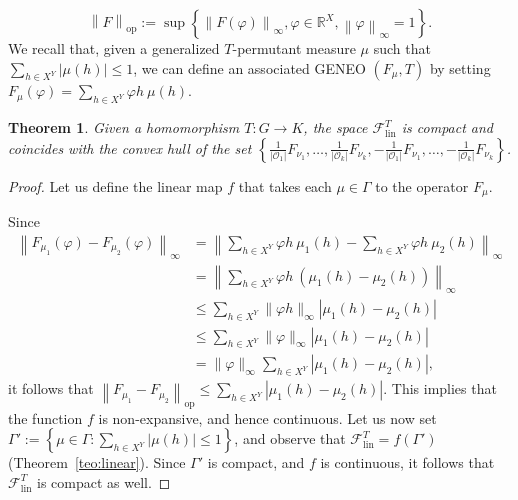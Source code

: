 \documentclass[11pt]{article}
\newcommand{\R}{\mathbb{R}}
\newcommand{\p}{\varphi}
\newtheorem{theorem}{Theorem}[section]
\begin{document}
{\[
\left\| F \right\|_\mathrm{op} := \sup\left\{ \left\| F(\p) \right\|_\infty, \p \in \R^X, \left\| \p \right\|_\infty = 1 \right\}.
\]
We recall that, given a generalized $T$-permutant measure $\mu$ such that $\sum_{h\in X^Y}|\mu(h)|\le 1$, 
we can define an associated GENEO $(F_\mu,T)$ by setting 
$F_\mu(\p)=\sum_{h \in X^Y} \varphi h \ \mu(h)$.
\begin{theorem}\label{thmcomp&conv}
    Given a homomorphism $T \colon G \to K$, the space $\mathcal{F}_\mathrm{lin}^T$ is compact and coincides with the convex hull of the set $\left\{\frac{1}{|\mathcal{O}_1|}F_{\nu_1},\ldots, 
    \frac{1}{|\mathcal{O}_k|}F_{\nu_k},
    -\frac{1}{|\mathcal{O}_1|}F_{\nu_1},\ldots, 
    -\frac{1}{|\mathcal{O}_k|}F_{\nu_k}\right\}$.
\end{theorem}
\begin{proof}
Let us define the linear map $f$
that takes each $\mu\in\Gamma$ to the operator $F_\mu$.

Since
$$\begin{aligned}
\left\|F_{\mu_1}(\varphi)-F_{\mu_2}(\varphi)\right\|_\infty
&=\left\|\sum_{h\in X^Y} \varphi h\ \mu_1(h)-\sum_{h\in X^Y} \varphi h\ \mu_2(h)\right\|_\infty \\
&=\left\|\sum_{h\in X^Y} \varphi h \ (\mu_1(h)-\mu_2(h))\right\|_\infty \\
&\le \sum_{h\in X^Y} \|\varphi h\|_\infty|\mu_1(h)-\mu_2(h)| \\
&\le \sum_{h\in X^Y} \|\varphi \|_\infty|\mu_1(h)-\mu_2(h)| \\
&= \|\varphi \|_\infty\sum_{h\in X^Y} |\mu_1(h)-\mu_2(h)|, 
\end{aligned}
$$
it follows 
that
$\left\| F_{\mu_1}-F_{\mu_2} \right\|_\mathrm{op}\le \sum_{h\in X^Y} |\mu_1(h)-\mu_2(h)|$.
This implies that the function $f$ is non-expansive, and hence continuous. Let us now set
$\Gamma' := \left\{ \mu \in \Gamma : \sum_{h \in X^Y} |\mu(h)| \le 1 \right\}$, and observe that $\mathcal{F}^T_{\mathrm{lin}} = f(\Gamma')$ (Theorem~\ref{teo:linear}).
Since 
$\Gamma'$ is compact, and $f$
is continuous, it follows that $\mathcal{F}^T_{\mathrm{lin}}$ is compact as well.



\end{proof}}
\end{document}
